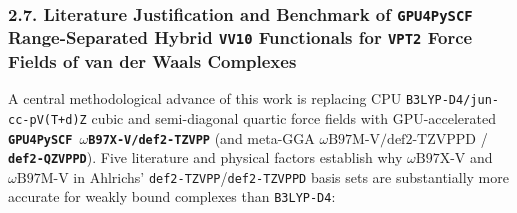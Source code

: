 \documentclass[journal=jpclcd,manuscript=article]{achemso}
\begin{document}
\subsubsection{2.7. Literature Justification and Benchmark of \texttt{GPU4PySCF} Range-Separated Hybrid \texttt{VV10} Functionals for \texttt{VPT2} Force Fields of van der Waals Complexes}
A central methodological advance of this work is replacing CPU \texttt{B3LYP-D4/jun-cc-pV(T+d)Z} cubic and semi-diagonal quartic force fields with GPU-accelerated \textbf{\texttt{GPU4PySCF $\omega$B97X-V/def2-TZVPP}} (and meta-GGA \textbf{$\omega\text{B97M-V/def2-TZVPPD}$} / \textbf{\texttt{def2-QZVPPD}}). Five literature and physical factors establish why $\omega\text{B97X-V}$ and $\omega\text{B97M-V}$ in Ahlrichs' \texttt{def2-TZVPP}/\texttt{def2-TZVPPD} basis sets are substantially more accurate for weakly bound complexes than \texttt{B3LYP-D4}:
\end{document}
